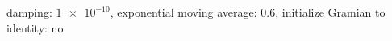 damping: $\num[scientific-notation=true]{1e-10}$, exponential moving average: $\num[scientific-notation=true]{0.6}$, initialize Gramian to identity: no